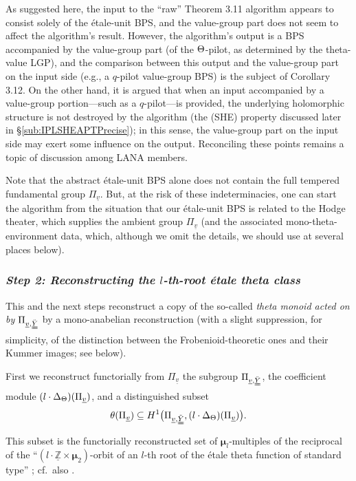 \documentclass[12pt, reqno, a4paper]{amsart}
\def\udl#1{\underline{#1}} %
\def\bZ{\mathbb{Z}} %
\def\uv{\udl{v}} %
\def\bmu{\bm{\mu}}
\begin{document}
\begin{rem}
As suggested here, the input to the ``raw'' Theorem 3.11 algorithm appears to consist solely of the \'etale-unit BPS, and the value-group part does not seem to affect the algorithm's result. However, the algorithm's output is a BPS accompanied by the value-group part (of the $\Th$-pilot, as determined by the theta-value LGP), and the comparison between this output and the value-group part on the input side (e.g., a $q$-pilot value-group BPS) is the subject of Corollary 3.12. On the other hand, it is argued that when an input accompanied by a value-group portion---such as a $q$-pilot---is provided, the underlying holomorphic structure is not destroyed by the algorithm (the (SHE) property discussed later in \S\ref{sub:IPLSHEAPTPrecise}); in this sense, the value-group part on the input side may exert some influence on the output. Reconciling these points remains a topic of discussion among LANA members. 
\end{rem}

Note that the abstract \'etale-unit BPS alone does not contain the full tempered fundamental group \(\Pi_{\uv}\).
But, at the risk of these indeterminacies, one can start the algorithm from the situation that our \'etale-unit BPS is related to the Hodge theater, which supplies the ambient group \(\Pi_{\uv}\) (and the associated mono-theta-environment data, which, although we omit the details, we should use at several places below).


\subsubsection{\emph{Step 2: Reconstructing the \(l\)-th-root \'etale theta class}}
This and the next steps reconstruct a copy of the so-called {\it theta monoid acted on by $\Pi_{\uv,\dduuY}$} by a mono-anabelian reconstruction \cite[Prop.\ 1.4]{MR4225474} (with a slight suppression, for simplicity, of the distinction between the Frobenioid-theoretic ones and their Kummer images; see below).

First we reconstruct functorially from \(\Pi_{\uv}\) the subgroup \(\Pi_{\uv,\dduuY}\), the coefficient module \((l\cdot\Delta_{\Th})(\Pi_{\uv})\), and a distinguished subset
\begin{equation}\label{equ:thetaPi}
  \theta(\Pi_{\uv})
  \subseteq
  H^1\bigl(\Pi_{\uv,\dduuY},(l\cdot\Delta_{\Th})(\Pi_{\uv})\bigr).
\end{equation}
This subset is the functorially reconstructed set of
\(\bmu_l\)-multiples of the reciprocal of the
``\((l\cdot\underline{\bZ}\times\bmu_2)\)-orbit of an \(l\)-th root of
the \'etale theta function of standard type''
\cite[Prop.~1.4, pp.~237--238]{MR4225474};
cf.\ also \cite[Def.~2.7, p.~267]{MR2512782}.
\end{document}
